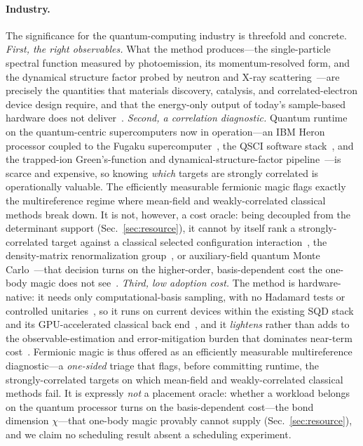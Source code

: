 \paragraph{Industry.} The significance for the quantum-computing industry is threefold and concrete.
\emph{First, the right observables.} What the method produces---the single-particle spectral function
measured by photoemission, its momentum-resolved form, and the dynamical structure factor probed by
neutron and X-ray scattering~\cite{squires2012,ament2011}---are precisely the quantities that
materials discovery, catalysis, and correlated-electron device design require, and that the
energy-only output of today's sample-based hardware does not
deliver~\cite{robledomoreno2025,extsqd2025}. \emph{Second, a correlation diagnostic.} Quantum runtime on the quantum-centric
supercomputers now in operation---an IBM Heron processor coupled to the Fugaku
supercomputer~\cite{robledomoreno2025,shirakawa2025}, the QSCI software
stack~\cite{kanno2023,adaptqsci}, and the trapped-ion Green's-function and
dynamical-structure-factor pipeline~\cite{greenediniz2024,quantinuum_dsf2026}---is scarce and
expensive, so knowing \emph{which} targets are strongly correlated is operationally valuable. The
efficiently measurable fermionic magic flags exactly the multireference regime where mean-field and
weakly-correlated classical methods break down. It is not, however, a cost oracle: being
decoupled from the determinant support (Sec.~\ref{sec:resource}), it cannot by itself rank a strongly-correlated target against a
classical selected configuration interaction~\cite{sharmashci2017,tubmanasci2016}, the density-matrix
renormalization group~\cite{whitedmrg1992}, or auxiliary-field quantum Monte
Carlo~\cite{mottazhang2018}---that decision turns on the higher-order, basis-dependent cost the
one-body magic does not see~\cite{reinholdt2025}. \emph{Third, low adoption cost.} The method is
hardware-native: it needs only computational-basis sampling, with no Hadamard tests or controlled
unitaries~\cite{bauer2016,endo2020}, so it runs on current devices within the existing SQD stack and
its GPU-accelerated classical back end~\cite{gpusqdomp,gpusqdthrust}, and it \emph{lightens} rather than adds to the
observable-estimation and error-mitigation burden that dominates near-term
cost~\cite{qesem2025,algorithmiq2026,qedma2026}. Fermionic magic is thus offered as an efficiently
measurable multireference diagnostic---a \emph{one-sided} triage that flags, before committing runtime,
the strongly-correlated targets on which mean-field and weakly-correlated classical methods fail. It is
expressly \emph{not} a placement oracle: whether a workload belongs on the quantum processor turns on the
basis-dependent cost---the bond dimension $\chi$---that one-body magic provably cannot supply
(Sec.~\ref{sec:resource}), and we claim no scheduling result absent a scheduling experiment.
